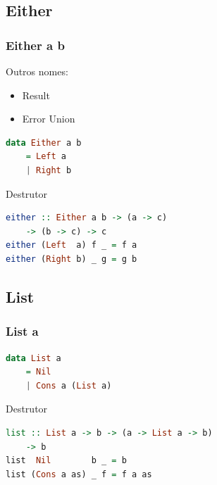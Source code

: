 \documentclass{beamer}
\begin{document}
\subsection{Either}
\begin{frame}[fragile]
    \frametitle{Either a b}
    Outros nomes:
    \begin{itemize}
        \item Result
        \item Error Union
    \end{itemize}
    \vfill
    \begin{lstlisting}[language=Haskell]
data Either a b
    = Left a
    | Right b
    \end{lstlisting}
    \vfill
    Destrutor
    \begin{lstlisting}[language=Haskell]
either :: Either a b -> (a -> c)
    -> (b -> c) -> c
either (Left  a) f _ = f a
either (Right b) _ g = g b
    \end{lstlisting}
\end{frame}

\subsection{List}
\begin{frame}[fragile]
    \frametitle{List a}
    \begin{lstlisting}[language=Haskell]
data List a
    = Nil
    | Cons a (List a)
    \end{lstlisting}
    \vfill
    Destrutor
    \begin{lstlisting}[language=Haskell]
list :: List a -> b -> (a -> List a -> b)
    -> b
list  Nil        b _ = b
list (Cons a as) _ f = f a as
    \end{lstlisting}
\end{frame}
\end{document}
